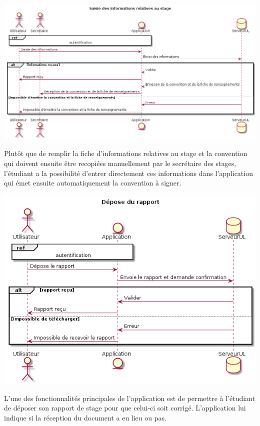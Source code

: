 \documentclass{scrreprt}
\begin{document}
\begin{center}
	\includegraphics[scale=0.4]{image/saisieInfosStage.png}
\end{center}
\hspace{1cm}Plutôt que de remplir la fiche d'informations relatives au stage et la convention qui doivent ensuite être recopiées manuellement par le secrétaire des stages, l'étudiant a la possibilité d'entrer directement ces informations dans l'application qui émet ensuite automatiquement la convention à signer.

\begin{center}
	\includegraphics[scale=0.50]{image/deposeRapport.png}
\end{center}
\hspace{1cm}L'une des fonctionnalités principales de l'application est de permettre à l'étudiant de déposer son rapport de stage pour que celui-ci soit corrigé. L'application lui indique si la réception du document a eu lieu ou pas.
\end{document}
